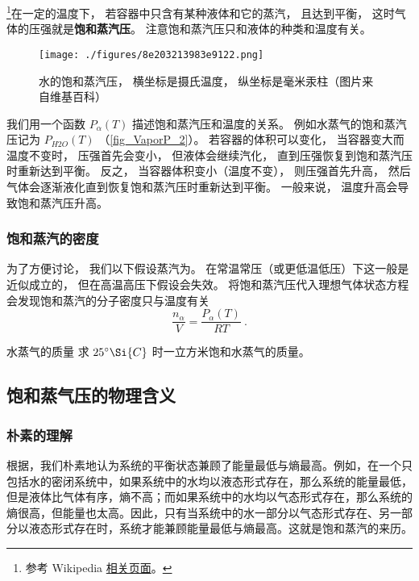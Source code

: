 

\footnote{参考 Wikipedia \href{https://en.wikipedia.org/wiki/Vapor_pressure}{相关页面}。}在一定的温度下， 若容器中只含有某种液体和它的蒸汽， 且达到平衡， 这时气体的压强就是\textbf{饱和蒸汽压}。 注意饱和蒸汽压只和液体的种类和温度有关。

\begin{figure}[ht]
\centering
\texttt{[image: ./figures/8e203213983e9122.png]}
\caption{水的饱和蒸汽压， 横坐标是摄氏温度， 纵坐标是毫米汞柱（图片来自维基百科）} \label{fig_VaporP_2}
\end{figure}

我们用一个函数 $P_\alpha(T)$ 描述饱和蒸汽压和温度的关系。 例如水蒸气的饱和蒸汽压记为 $P_{H2O}(T)$ （\autoref{fig_VaporP_2}）。 若容器的体积可以变化， 当容器变大而温度不变时， 压强首先会变小， 但液体会继续汽化， 直到压强恢复到饱和蒸汽压时重新达到平衡。 反之， 当容器体积变小（温度不变）， 则压强首先升高，  然后气体会逐渐液化直到恢复饱和蒸汽压时重新达到平衡。 一般来说， 温度升高会导致饱和蒸汽压升高。

\subsubsection{饱和蒸汽的密度}
为了方便讨论， 我们以下假设蒸汽为。 在常温常压（或更低温低压）下这一般是近似成立的， 但在高温高压下假设会失效。 将饱和蒸汽压代入理想气体状态方程会发现饱和蒸汽的分子密度只与温度有关
\begin{equation}\label{eq_VaporP_2}
\frac{n_\alpha}{V}  = \frac{P_\alpha(T)}{R T}~.
\end{equation}

\begin{exercise}{水蒸气的质量}
求 $25^\circ\Si{C}$ 时一立方米饱和水蒸气的质量。
\end{exercise}

\subsection{饱和蒸气压的物理含义}
\subsubsection{朴素的理解}
根据，我们朴素地认为系统的平衡状态兼顾了能量最低与熵最高。例如，在一个只包括水的密闭系统中，如果系统中的水均以液态形式存在，那么系统的能量最低，但是液体比气体有序，熵不高；而如果系统中的水均以气态形式存在，那么系统的熵很高，但能量也太高。因此，只有当系统中的水一部分以气态形式存在、另一部分以液态形式存在时，系统才能兼顾能量最低与熵最高。这就是饱和蒸汽的来历。

